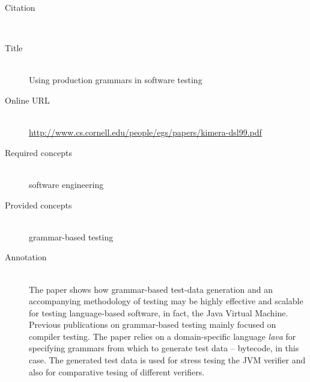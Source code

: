 \begin{description}
\item[Citation]\mbox{}\\
\cite{SirerB99}
\item[Title]\mbox{}\\
Using production grammars in software testing
\item[Online URL]\mbox{}\\
{\footnotesize\url{http://www.cs.cornell.edu/people/egs/papers/kimera-dsl99.pdf}}
\item[Required concepts]\mbox{}\\
software engineering\item[Provided concepts]\mbox{}\\
grammar-based testing\item[Annotation]\mbox{}\\
The paper shows how grammar-based test-data generation and an accompanying methodology of testing may be highly effective and scalable for testing language-based software, in fact, the Java Virtual Machine. Previous publications on grammar-based testing mainly focused on compiler testing. The paper relies on a domain-specific language \emph{lava} for specifying grammars from which to generate test data -- bytecode, in this case. The generated test data is used for stress tesing the JVM verifier and also for comparative tesing of different verifiers.
\end{description}

